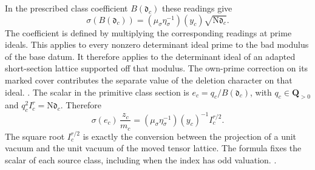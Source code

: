 In the prescribed class coefficient \(B(\mathfrak d_c)\)
these readings give
\begin{equation}
 \sigma(B(\mathfrak d_c))
   =(\mu_\sigma\eta_\sigma^{-1})(y_c)\sqrt{\mathrm N\mathfrak d_c}.
 \label{eq:stage-determinant-ideal-reading}
\end{equation}
The coefficient is defined by multiplying the corresponding
readings at prime ideals. This applies to every nonzero
determinant ideal prime to the bad modulus of the base datum.
It therefore applies to the determinant ideal of an adapted
short-section lattice supported off that modulus. The
own-prime correction on its marked cover contributes the
separate value of the deletion character on that ideal.
.
The scalar in the primitive class section is
\(e_c=q_c/B(\mathfrak d_c)\), with \(q_c\in\mathbf Q_{>0}\)
and \(q_c^2 I_c^r=\mathrm N\mathfrak d_c\).
Therefore
\[
 \sigma(e_c)\,\frac{z_c}{m_c}
   =(\mu_\sigma\eta_\sigma^{-1})(y_c)^{-1} I_c^{r/2}.
\]
The square root \(I_c^{r/2}\) is exactly the conversion
between the projection of a unit vacuum and the
unit vacuum of the moved tensor lattice. The formula
fixes the scalar of each source class, including when
the index has odd valuation.
.

